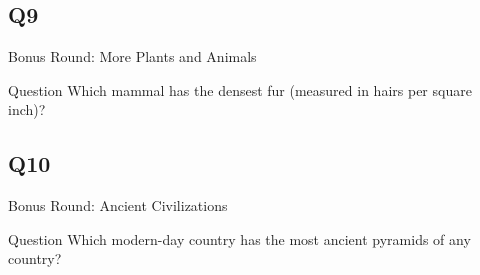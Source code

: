 \documentclass[11pt]{beamer}
\begin{document}
\subsection*{Q9}
\begin{frame}[t]{Bonus Round: More Plants and Animals}
\begin{block}{Question}
Which mammal has the densest fur (measured in hairs per square inch)?
\end{block}
\end{frame}
\subsection*{Q10}
\begin{frame}[t]{Bonus Round: Ancient Civilizations}
\begin{block}{Question}
Which modern-day country has the most ancient pyramids of any country?
\end{block}
\end{frame}
\end{document}
